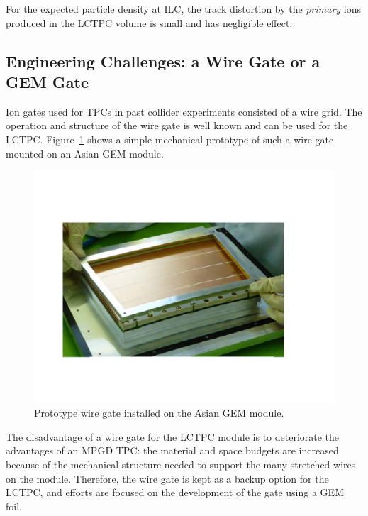 For the expected particle density at ILC, the track distortion by the
{\em{primary}} ions produced in the LCTPC volume is small and has negligible effect.



\subsection{Engineering Challenges: a Wire Gate or a GEM Gate}

Ion gates used for TPCs in past collider experiments consisted of a wire grid. The operation and
structure of the wire gate is well known and can be used for the LCTPC. Figure~\ref{Fig2gating} shows
a simple mechanical prototype of such a wire gate mounted on an Asian GEM module.


\begin{figure}[htb!]
\begin{center}
\includegraphics[width=\columnwidth]{Tracker/TPC_Bonn/plots/TPC-Gate_Fig2gating.pdf}%
\caption{\label{Fig2gating} {Prototype wire gate installed on the Asian GEM module.}}
\end{center}
\end{figure}

The disadvantage of a wire gate for the LCTPC module is to deteriorate the advantages of an MPGD TPC:
the material and space budgets are increased because of the mechanical structure needed to support the many
stretched wires on the module. Therefore, the wire gate is kept as a backup option for the LCTPC, and efforts
are focused on the development of the gate using a GEM foil.

